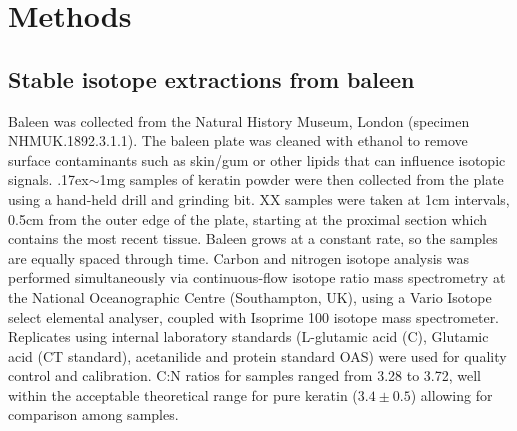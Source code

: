\documentclass[a4paper,12pt]{article}
\begin{document}
\section{Methods}

\subsection{Stable isotope extractions from baleen}
Baleen was collected from the Natural History Museum, London (specimen NHMUK.1892.3.1.1). 
The baleen plate was cleaned with ethanol to remove surface contaminants such as skin/gum or other lipids that can influence isotopic signals. 
{\raise.17ex\hbox{$\scriptstyle\sim$}}1mg samples of keratin powder were then collected from the plate using a hand-held drill and grinding bit. 
XX samples were taken at 1cm intervals, 0.5cm from the outer edge of the plate, starting at the proximal section which contains the most recent tissue. 
Baleen grows at a constant rate, so the samples are equally spaced through time\cite{best1996stable}. 
Carbon and nitrogen isotope analysis was performed simultaneously via continuous-flow isotope ratio mass spectrometry at the National Oceanographic Centre (Southampton, UK), using a Vario Isotope select elemental analyser, coupled with Isoprime 100 isotope mass spectrometer. 
Replicates using internal laboratory standards (L-glutamic acid (C), Glutamic acid (CT standard), acetanilide and protein standard OAS) were used for quality control and calibration. 
C:N ratios for samples ranged from 3.28\text{\textperthousand} to 3.72\text{\textperthousand}, well within the acceptable theoretical range for pure keratin ($3.4\pm0.5$) allowing for comparison among samples\cite{hobson1998stable}. 
 
\end{document}
